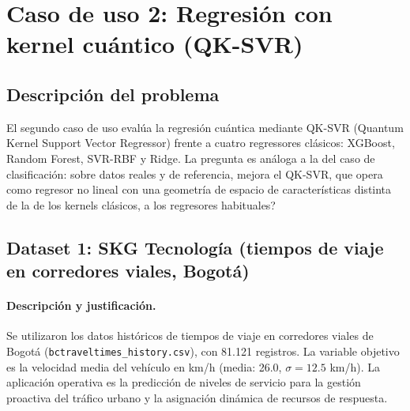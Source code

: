 \section{Caso de uso 2: Regresión con kernel cuántico (QK-SVR)}

\subsection{Descripción del problema}

El segundo caso de uso evalúa la regresión cuántica mediante QK-SVR (Quantum Kernel Support Vector Regressor) frente a cuatro regressores clásicos: XGBoost, Random Forest, SVR-RBF y Ridge. La pregunta es análoga a la del caso de clasificación: sobre datos reales y de referencia, \textquestiondown{}mejora el QK-SVR, que opera como regresor no lineal con una geometría de espacio de características distinta de la de los kernels clásicos, a los regresores habituales?

\subsection{Dataset 1: SKG Tecnología (tiempos de viaje en corredores viales, Bogotá)}

\paragraph{Descripción y justificación.}
Se utilizaron los datos históricos de tiempos de viaje en corredores viales de Bogotá (\texttt{bctraveltimes\_history.csv}), con 81.121 registros. La variable objetivo es la velocidad media del vehículo en km/h (media: 26.0, $\sigma = 12.5$ km/h). La aplicación operativa es la predicción de niveles de servicio para la gestión proactiva del tráfico urbano y la asignación dinámica de recursos de respuesta.

